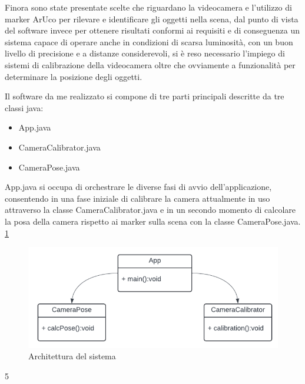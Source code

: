 \documentclass[12pt,a4paper,openright,twoside]{book}
\begin{document}
\noindent Finora sono state presentate scelte che riguardano la videocamera e l'utilizzo di marker ArUco per rilevare e identificare gli oggetti nella \gls{scena}, dal punto di vista del software invece per ottenere risultati conformi ai requisiti e di conseguenza un sistema capace di operare anche in condizioni di scarsa luminosità, con un buon livello di precisione e a distanze considerevoli, si è reso necessario l'impiego di sistemi di calibrazione della videocamera oltre che ovviamente a funzionalità per determinare la posizione degli oggetti.

Il software da me realizzato si compone di tre parti principali descritte da tre classi java:
\begin{itemize}
	\item App.java
	\item CameraCalibrator.java
	\item CameraPose.java
\end{itemize}
App.java si occupa di orchestrare le diverse fasi di avvio dell'applicazione, consentendo in una fase iniziale di calibrare la camera attualmente in uso attraverso la classe CameraCalibrator.java e in un secondo momento di calcolare la posa della camera rispetto ai marker sulla scena con la classe CameraPose.java. \ref{fig:architettura}
\begin{figure}
	\centering
	\includegraphics[width=0.8\linewidth]{./figures/UML/architecture.png}
	\caption{Architettura del sistema}
	\label{fig:architettura}
\end{figure}5

\end{document}
